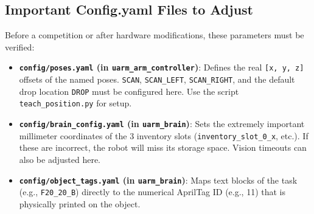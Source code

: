 \documentclass[12pt,a4paper]{article}
\begin{document}
\subsection{Important Config.yaml Files to Adjust}
Before a competition or after hardware modifications, these parameters must be verified:
\begin{itemize}
    \item \textbf{\texttt{config/poses.yaml} (in \texttt{uarm\_arm\_controller})}: Defines the real \texttt{[x, y, z]} offsets of the named poses. \texttt{SCAN}, \texttt{SCAN\_LEFT}, \texttt{SCAN\_RIGHT}, and the default drop location \texttt{DROP} must be configured here. Use the script \texttt{teach\_position.py} for setup.
    \item \textbf{\texttt{config/brain\_config.yaml} (in \texttt{uarm\_brain})}: Sets the extremely important millimeter coordinates of the 3 inventory slots (\texttt{inventory\_slot\_0\_x}, etc.). If these are incorrect, the robot will miss its storage space. Vision timeouts can also be adjusted here.
    \item \textbf{\texttt{config/object\_tags.yaml} (in \texttt{uarm\_brain})}: Maps text blocks of the task (e.g., \texttt{F20\_20\_B}) directly to the numerical AprilTag ID (e.g., 11) that is physically printed on the object.
\end{itemize}
\end{document}
